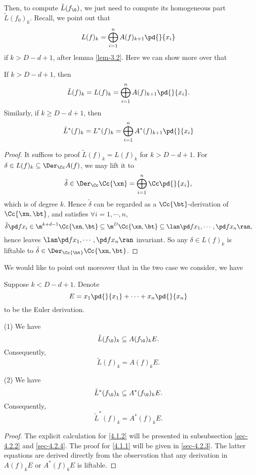 Then, to compute $\tilde L(f_\0)$, we just need to compute its homogeneous part $\tilde L (f_0)_k$. Recall, we point out that
\[L(f)_k=\bigoplus_{i=1}^nA(f)_{k+1}\pd{}{x_i}\]
if $k>D-d+1$, after lemma \ref{lem-3.2}. Here we can show more over that 
\begin{corollary}\label{cor-4.4}
  If $k>D-d+1$, then 
  \[\tilde L(f)_k=L(f)_k=\bigoplus_{i=1}^nA(f)_{k+1}\pd{}{x_i}.\]
  Similarly, if $k\geqslant D-d+1$, then
  \[\tilde L^*(f)_k=L^*(f)_k=\bigoplus_{i=1}^nA^*(f)_{k+1}\pd{}{x_i}\]
\end{corollary}
\begin{proof}
  It suffices to proof $\tilde L(f)_k = L(f)_k$ for $k>D-d+1$. For $\delta \in L(f)_k\subseteq \Der_\Cc A(f)$, we may lift it to 
  \[\tilde \delta \in \Der_\Cc\Cc\{\xn\}= \bigoplus_{i=1}^n \Cc\pd{}{x_i},\]
  which is of degree $k$. Hence $\tilde \delta$ can be regarded as a $\Cc\{\bt\}$-derivation of $\Cc\{\xn,\bt\}$, and satisfies $\forall i=1,\cdots, n$,
  \[\tilde \delta \pd f {x_i} \in \m^{k+d-1}\Cc\{\xn, \bt\} \subseteq \m^D \Cc\{\xn, \bt\} \subseteq \lan \pd f{x_1},\cdots, \pd f{x_n} \ran,\]
  hence leaves $ \lan \pd f{x_1},\cdots, \pd f{x_n} \ran$ invariant. So any $\delta \in L(f)_k$ is liftable to  $\tilde \delta \in \Der_{\Cc\{\bt\}}\Cc\{\xn ,\bt\}$.
\end{proof}

We would like to point out moreover that in the two case we consider, we have
\begin{proposition}\label{pro-4.5}
  Suppose $k<D-d+1$. Denote 
  \[E=x_1\pd{}{x_1}+\cdots +x_n\pd{} {x_n}\]
  to be the Euler derivation.
\item[(1)]We have
  \begin{equation}\label{4.1.1}
    \tilde L(f_\0)_k \subseteq A(f_\0)_k E.
  \end{equation}
  Consequently,
  \[\tilde L(f)_k =  A(f)_kE.\]
\item[(2)]We have
  \begin{equation}\label{4.1.2}
    \tilde L^*(f_\0)_k \subseteq A^*(f_\0)_k E.
  \end{equation}
  Consequently,
  \[\tilde L^*(f)_k =  A^*(f)_kE.\]
\end{proposition}
\begin{proof}
  The explicit calculation for  \eqref{4.1.2} will  be presented in subsubsection \ref{sec-4.2.2} and \ref{sec-4.2.4}. The proof for \eqref{4.1.1} will be given in \ref{sec-4.2.3}.  The latter equations are derived directly from the observation that any derivation in $A(f)_kE$ or $A^*(f)_kE$ is liftable.
\end{proof}




